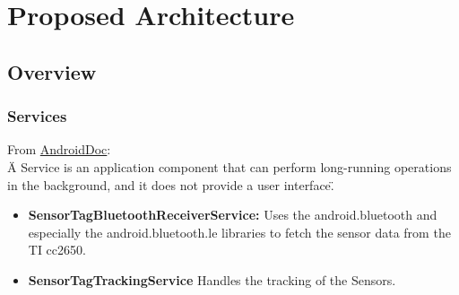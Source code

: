 \section{Proposed Architecture}

\subsection{Overview}

\subsubsection{Services}
From \href{https://developer.android.com/guide/components/services.html}{AndroidDoc}: \\
\"A Service is an application component that can perform long-running operations in the background, and it does not provide a user interface\".
\begin{itemize}
  \item \textbf{SensorTagBluetoothReceiverService:} Uses the android.bluetooth and especially the android.bluetooth.le libraries to fetch the sensor data from the TI cc2650. \\
  \item \textbf{SensorTagTrackingService} Handles the tracking of the Sensors.
\end{itemize}


